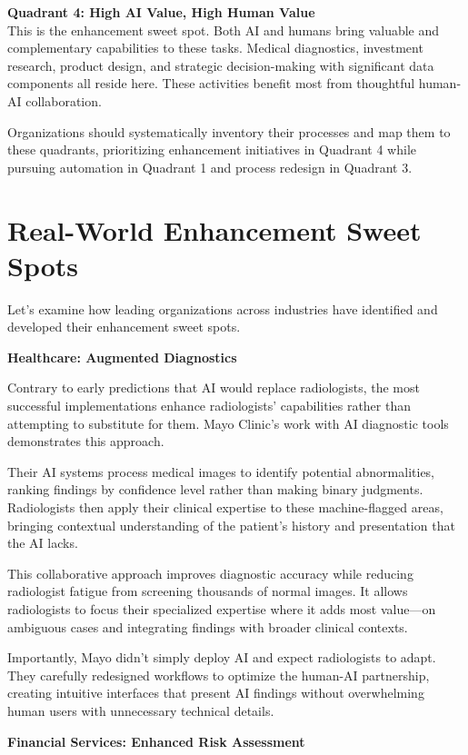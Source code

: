 \documentclass[
  Letterpaper,
]{scrbook}
\begin{document}
\textbf{Quadrant 4: High AI Value, High Human Value}\\
This is the enhancement sweet spot. Both AI and humans bring valuable
and complementary capabilities to these tasks. Medical diagnostics,
investment research, product design, and strategic decision-making with
significant data components all reside here. These activities benefit
most from thoughtful human-AI collaboration.

Organizations should systematically inventory their processes and map
them to these quadrants, prioritizing enhancement initiatives in
Quadrant 4 while pursuing automation in Quadrant 1 and process redesign
in Quadrant 3.

\section{Real-World Enhancement Sweet
Spots}\label{real-world-enhancement-sweet-spots}

Let's examine how leading organizations across industries have
identified and developed their enhancement sweet spots.

\textbf{Healthcare: Augmented Diagnostics}

Contrary to early predictions that AI would replace radiologists, the
most successful implementations enhance radiologists' capabilities
rather than attempting to substitute for them. Mayo Clinic's work with
AI diagnostic tools demonstrates this approach.

Their AI systems process medical images to identify potential
abnormalities, ranking findings by confidence level rather than making
binary judgments. Radiologists then apply their clinical expertise to
these machine-flagged areas, bringing contextual understanding of the
patient's history and presentation that the AI lacks.

This collaborative approach improves diagnostic accuracy while reducing
radiologist fatigue from screening thousands of normal images. It allows
radiologists to focus their specialized expertise where it adds most
value---on ambiguous cases and integrating findings with broader
clinical contexts.

Importantly, Mayo didn't simply deploy AI and expect radiologists to
adapt. They carefully redesigned workflows to optimize the human-AI
partnership, creating intuitive interfaces that present AI findings
without overwhelming human users with unnecessary technical details.

\textbf{Financial Services: Enhanced Risk Assessment}
\end{document}
